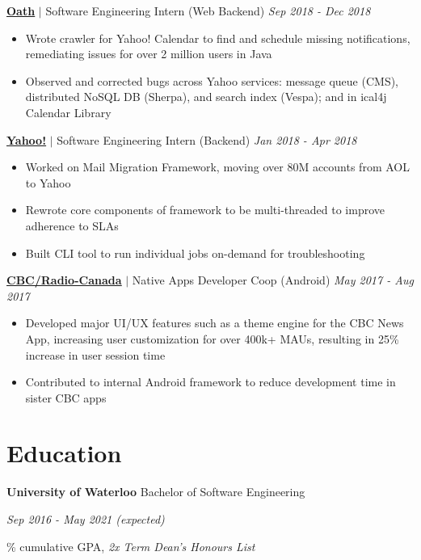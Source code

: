 \documentclass[paper=a4,fontsize=15pt]{scrartcl}
\newcommand{\smolboispace}{\vspace*{0.1em}}
\newcommand{\quarterspace}{\vspace*{0.25em}}
\newcommand{\bighalfspace}{\vspace*{0.75em}}
\begin{document}
\smolboispace
\smolboispace
\bighalfspace
\normalsize
\noindent \href{https://mail.yahoo.com}{\textbf{\ul{Oath}}}
$\vert$ \small Software Engineering Intern (Web Backend)
{\hfill \footnotesize \textit{Sep 2018 - Dec 2018}}
\begin{itemize}[noitemsep,leftmargin=20pt,label=\raisebox{0.25ex}{\tiny$\bullet$},topsep=5pt]
  \small
    \item Wrote crawler for Yahoo! Calendar to find and schedule missing notifications, remediating issues for over 2 million users in Java
    \item Observed and corrected bugs across Yahoo services: message queue (CMS), distributed NoSQL DB (Sherpa), and search index (Vespa); and in ical4j Calendar Library
    
\end{itemize}

\smolboispace
\smolboispace
\bighalfspace
\normalsize
\noindent \href{https://mail.yahoo.com}{\textbf{\ul{Yahoo!}}}
$\vert$ \small Software Engineering Intern (Backend)
{\hfill \footnotesize \textit{Jan 2018 - Apr 2018}}
\begin{itemize}[noitemsep,leftmargin=20pt,label=\raisebox{0.25ex}{\tiny$\bullet$},topsep=5pt]
  \small
    \item Worked on Mail Migration Framework, moving over 80M accounts from AOL to Yahoo
    \item Rewrote core components of framework to be multi-threaded to improve adherence to SLAs
    \item Built CLI tool to run individual jobs on-demand for troubleshooting
\end{itemize}

\smolboispace
\smolboispace
\bighalfspace
\normalsize
\noindent \href{https://cbc.ca}{\ul{\textbf{CBC/Radio-Canada}}}
$\vert$ \small Native Apps Developer Coop (Android)
{\hfill \footnotesize \textit{May 2017 - Aug 2017}}
\begin{itemize}[noitemsep,leftmargin=20pt,label=\raisebox{0.25ex}{\tiny$\bullet$},topsep=5pt]
  \small
    \item Developed major UI/UX features such as a theme engine for the CBC News App, increasing user customization for over 400k+ MAUs, resulting in 25\% increase in user session time
    \item Contributed to internal Android framework to reduce development time in sister CBC apps
\end{itemize}

\section*{Education}{}
\noindent \textbf{University of Waterloo} Bachelor of Software Engineering \par
\quarterspace
\footnotesize
\noindent \textit{Sep 2016 - May 2021 (expected)} \par
{}\% cumulative GPA, \textit{2x Term Dean's Honours List}
\end{document}
